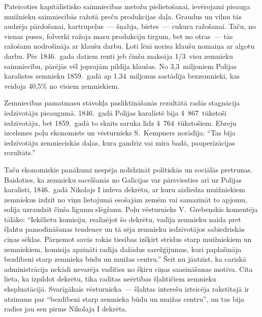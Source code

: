 \documentclass[twoside,a5paper,12pt,fleqn,openany]{extbook}
\begin{document}
Pateicoties kapitālistisko saimniecības metožu pielietošanai, ievērojami pieauga muižnieku saimniecībās ražotā preču produkcijas daļa. Graudus un vilnu tās audzēja pārdošanai, kartrupeļus~--- šņabja, bietes~--- cukura ražošanai. Taču, no vienas puses, folverki ražoja masu produkciju tirgum, bet no otras~--- tās ražošanu nodrošināja ar klaušu darbu. Ļoti lēni norisa klaušu nomaiņa ar algotu darbu. Pēc 1846.~gada datiem renti jeb činšu maksāja 1/3~visu zemnieku saimniecību, pārējās vēl joprojām pildīja klaušas. No 3,3~miljoniem Polijas karalistes zemnieku 1859.~gadā ap 1,34~miljonus sastādīja bezzemnieki, kas veidoja 40,5\% no visiem zemniekiem.

Zemniecības pamatmasu stāvokļa pasliktināšanās rezultātā radās stagnācija iedzīvotāju pieaugumā. 1846.~gadā Polijas karalistē bija 4~867~tūkstoši iedzīvotāju, bet 1859.~gadā to skaits saruka līdz 4~764~tūkstošiem. Ebreju izcelsmes poļu ekonomists un vēsturnieks S.~Kempners norādīja: ``Tas bija iedzīvotāju zemnieciskās daļas, kura gandrīz vai mira badā, pauperizācijas rezultāts.''

Taču ekonomiskie panākumi nespēja nolīdzināt politiskās un sociālās pretrunas. Baidoties, ka zemnieku sacelšanās no Galīcijas var pārsviesties arī uz Polijas karalisti, 1846.~gadā Nikolajs I izdeva dekrētu, ar kuru aizliedza muižniekiem zemniekus izdzīt no viņu lietojumā esošajām zemēm vai samazināt to apjomu, solīja uzraudzīt činša līgumu slēgšanu. Poļu vēsturnieks V.~Grebeņskis komentēja tālāko: ``Iekšlietu komisiju, realizējot šo dekrētu, vadīja zemnieku naida pret šļahtu pamodināšanas tendence un tā sēja zemnieku iedzīvotājos sabiedriskās cīņas sēklas. Pārņemot savās rokās tiesības izšķirt strīdus starp muižniekiem un zemniekiem, komisija apzināti radīja dažādus sarežģījumus, kuri paplašināja bezdibeni starp zemnieka būdu un muižas centru.'' Šeit nu jāatzīst, ka cariskā administrācija nekādi nevarēja vadīties no šķiru cīņas saasināšanas motīva. Cita lieta, ka izpildot dekrētu, tika radītas neērtības šļahtičiem zemnieku ekspluatācijā. Svarīgākais vēsturnieka~--- šļahtas interešu izteicēja rakstītajā ir atzinums par ``bezdibeni starp zemnieka būdu un muižas centru'', un tas bija radies jau sen pirms Nikolaja I dekrēta.
\end{document}
